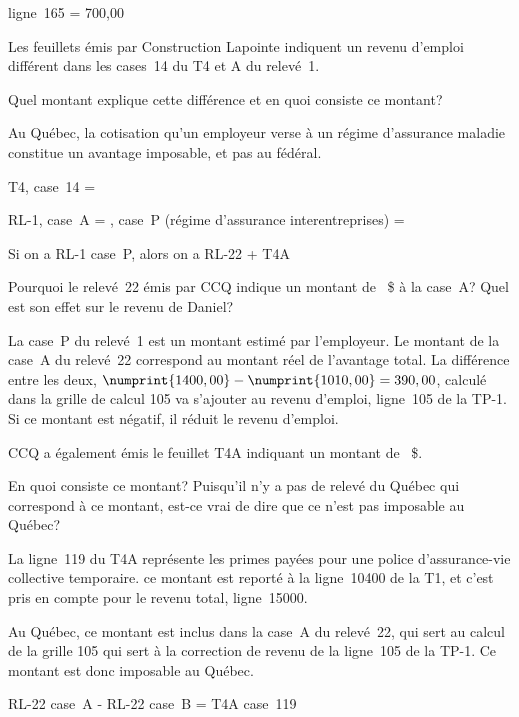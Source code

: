 ligne~165 = 700,00

\begin{question}
	Les feuillets émis par Construction Lapointe indiquent un revenu d'emploi différent dans les cases~14 du T4 et A du relevé~1. 
	
	Quel montant explique cette différence et en quoi consiste ce montant?
\end{question}
Au Québec, la cotisation qu'un employeur verse à un régime d'assurance maladie constitue un avantage imposable, et pas au fédéral.

T4, case~14 = 

RL-1, case~A = , case~P (régime d'assurance interentreprises) =  

Si on a RL-1 case~P, alors on a RL-22 + T4A

\begin{question}
	Pourquoi le relevé~22 émis par CCQ indique un montant de ~\$ à la case~A? Quel est son effet sur le revenu de Daniel?
\end{question}
La case~P du relevé~1 est un montant estimé par l'employeur. Le montant de la case~A du relevé~22 correspond  au montant réel de l'avantage total. La différence entre les deux, $\numprint{1400,00} - \numprint{1010,00} = 390,00$, calculé dans la grille de calcul 105 va s'ajouter au revenu d'emploi, ligne~105 de la TP-1. Si ce montant est négatif, il réduit le revenu d'emploi.

\begin{question}
	CCQ a également émis le feuillet T4A indiquant un montant de ~\$.
	
	En quoi consiste ce montant? Puisqu'il n'y a pas de relevé du Québec qui correspond à ce montant, est-ce vrai de dire que ce n'est pas imposable au Québec?
\end{question}
La ligne~119 du T4A représente les primes payées pour une police d'assurance-vie collective temporaire. ce montant est reporté à la ligne~10400 de la T1, et c'est pris en compte pour le revenu total, ligne~15000.

Au Québec, ce montant est inclus dans la case~A du relevé~22, qui sert au calcul de la grille 105 qui sert à la correction de revenu de la ligne~105 de la TP-1. Ce montant est donc imposable au Québec.

RL-22 case~A - RL-22 case~B = T4A case~119

